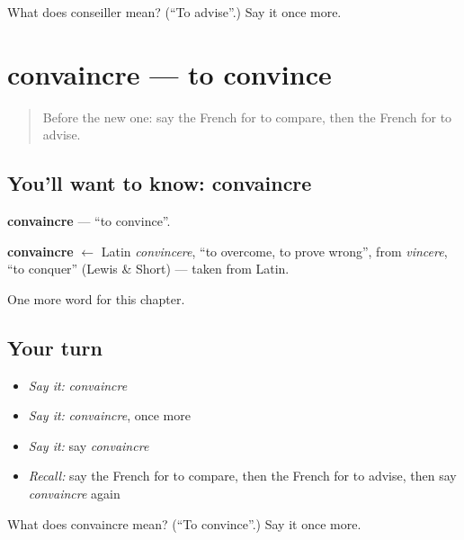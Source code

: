 \begin{tcolorbox}[breakable,colback=teal!4,colframe=teal!35!black,title={Before you move on}]
What does conseiller mean? (\textquotedblleft{}To advise\textquotedblright{}.) Say it once more.
\end{tcolorbox}
\section[convaincre]{convaincre — to convince}

\label{lesson:FR-C147-convaincre}



\begin{quote}
Before the new one: say the French for to compare, then the French for to advise.
\end{quote}

\subsection*{You'll want to know: convaincre}
\textbf{convaincre} — \textquotedblleft{}to convince\textquotedblright{}.

\begin{cousinweb}
\textbf{convaincre} $\leftarrow$ Latin \emph{convincere}, \textquotedblleft{}to overcome, to prove wrong\textquotedblright{}, from \emph{vincere}, \textquotedblleft{}to conquer\textquotedblright{} (Lewis \& Short) — taken from Latin.
\end{cousinweb}

\begin{grammarlens}[title={What you've built}]
One more word for this chapter.
\end{grammarlens}

\subsection*{Your turn}
\begin{itemize}
\raggedright
  \item \emph{Say it:} \emph{convaincre}
  \item \emph{Say it:} \emph{convaincre}, once more
  \item \emph{Say it:} say \emph{convaincre}
  \item \emph{Recall:} say the French for to compare, then the French for to advise, then say \emph{convaincre} again
\end{itemize}

\begin{tcolorbox}[breakable,colback=teal!4,colframe=teal!35!black,title={Before you move on}]
What does convaincre mean? (\textquotedblleft{}To convince\textquotedblright{}.) Say it once more.
\end{tcolorbox}

